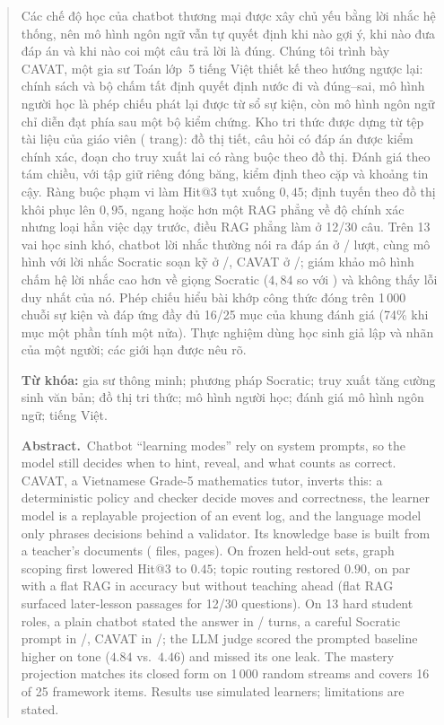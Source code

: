 \begin{abstract}
\noindent
Các chế độ học của chatbot thương mại được xây chủ yếu bằng lời nhắc hệ thống, nên mô hình ngôn ngữ vẫn tự quyết định khi nào gợi ý, khi nào đưa đáp án và khi nào coi một câu trả lời là đúng. Chúng tôi trình bày CAVAT, một gia sư Toán lớp~5 tiếng Việt thiết kế theo hướng ngược lại: chính sách và bộ chấm tất định quyết định nước đi và đúng--sai, mô hình người học là phép chiếu phát lại được từ sổ sự kiện, còn mô hình ngôn ngữ chỉ diễn đạt phía sau một bộ kiểm chứng. Kho tri thức được dựng từ \NDocs{} tệp tài liệu của giáo viên (\NPages{} trang): đồ thị \NNodes{} tiết, \NItems{} câu hỏi có đáp án được kiểm chính xác, \NChunks{} đoạn cho truy xuất lai có ràng buộc theo đồ thị. Đánh giá theo tám chiều, với tập giữ riêng đóng băng, kiểm định theo cặp và khoảng tin cậy. Ràng buộc phạm vi làm Hit@3 tụt xuống $0{,}45$; định tuyến theo đồ thị khôi phục lên $0{,}95$, ngang hoặc hơn một RAG phẳng về độ chính xác nhưng loại hẳn việc dạy trước, điều RAG phẳng làm ở 12/30 câu. Trên 13 vai học sinh khó, chatbot lời nhắc thường nói ra đáp án ở \BoneLeaks{}/\BoneTurns{} lượt, cùng mô hình với lời nhắc Socratic soạn kỹ ở \BtwoLeaks{}/\BtwoTurns{}, CAVAT ở \CavLeaks{}/\CavTurns{}; giám khảo mô hình chấm hệ lời nhắc cao hơn về giọng Socratic ($4{,}84$ so với \CavSocratic{}) và không thấy lỗi duy nhất của nó. Phép chiếu hiểu bài khớp công thức đóng trên 1\,000 chuỗi sự kiện và đáp ứng đầy đủ 16/25 mục của khung đánh giá (74\% khi mục một phần tính một nửa). Thực nghiệm dùng học sinh giả lập và nhãn của một người; các giới hạn được nêu rõ.

\vspace{4pt}
\noindent\textbf{Từ khóa:} gia sư thông minh; phương pháp Socratic; truy xuất tăng cường sinh văn bản; đồ thị tri thức; mô hình người học; đánh giá mô hình ngôn ngữ; tiếng Việt.

\vspace{6pt}
\noindent\textbf{Abstract.}\small\ 
Chatbot ``learning modes'' rely on system prompts, so the model still decides when to hint, reveal, and what counts as correct. CAVAT, a Vietnamese Grade-5 mathematics tutor, inverts this: a deterministic policy and checker decide moves and correctness, the learner model is a replayable projection of an event log, and the language model only phrases decisions behind a validator. Its knowledge base is built from a teacher's documents (\NDocs{} files, \NPages{} pages). On frozen held-out sets, graph scoping first lowered Hit@3 to $0.45$; topic routing restored $0.90$, on par with a flat RAG in accuracy but without teaching ahead (flat RAG surfaced later-lesson passages for 12/30 questions). On 13 hard student roles, a plain chatbot stated the answer in \BoneLeaks{}/\BoneTurns{} turns, a careful Socratic prompt in \BtwoLeaks{}/\BtwoTurns{}, CAVAT in \CavLeaks{}/\CavTurns{}; the LLM judge scored the prompted baseline higher on tone ($4.84$ vs.\ $4.46$) and missed its one leak. The mastery projection matches its closed form on 1\,000 random streams and covers 16 of 25 framework items. Results use simulated learners; limitations are stated.
\normalsize
\end{abstract}
